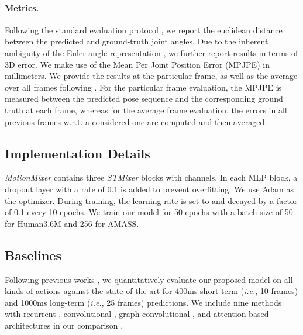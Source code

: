\documentclass{article}
\begin{document}
\begin{table*} [ht]
{\begin{tabular}{|c|ccccc|ccccc|ccccc|ccccc|}
\end{tabular}
}
\caption{Performance comparison between different methods in terms of short-term and long-term pose prediction via mean per joint position error for each activity from the Human3.6M dataset. We provide the error results for the particular frame as well as the average over all frames. () indicates methods that compute the average error over all frames. All other approaches evaluate at the particular frame, where the error is measured between the predictions and ground truth at each frame. The best performance is highlighted in boldface.} 
\label{tab:h36_all_3d}
\end{table*}

\paragraph{Metrics.} Following the standard evaluation protocol \cite{li2018convolutional,mao2020history,sofianos2021space}, we report the euclidean distance between the predicted and ground-truth joint angles. Due to the inherent ambiguity of the Euler-angle representation \cite{mao2019learning,mao2020history}, we further report results in terms of 3D error. We make use of the Mean Per Joint Position Error (MPJPE) in millimeters. We provide the results at the particular frame, as well as the average over all frames following \cite{sofianos2021space,zhong2022spatial}. For the particular frame evaluation, the MPJPE is measured between the predicted pose sequence and the corresponding ground truth at each frame, whereas for the average frame evaluation, the errors in all previous frames w.r.t. a considered one are computed and then averaged.

\subsection{Implementation Details}
\textit{MotionMixer} contains three \textit{STMixer} blocks with   channels. In each MLP block, a dropout layer with a rate of 0.1 is added to prevent overfitting. We use Adam \cite{kingma2014adam} as the optimizer. During training, the learning rate is set to  and decayed by a factor of 0.1 every 10 epochs.  We train our model for 50 epochs with a batch size of 50 for Human3.6M and 256 for AMASS. 

\subsection{Baselines } Following previous works \cite{martinez2017human,li2018convolutional,mao2019learning}, we quantitatively evaluate our proposed model on all kinds of actions against the state-of-the-art for 400ms short-term  ({\em i.e.}, 10 frames) and 1000ms long-term  ({\em i.e.}, 25 frames) predictions. 
We include nine methods with recurrent \cite{martinez2017human,mao2020history}, convolutional \cite{li2018convolutional,tang2018long}, graph-convolutional \cite{mao2019learning,sofianos2021space,dang2021msr,zhong2022spatial}, and attention-based architectures  \cite{mao2021multi} in our comparison . 
\end{document}
